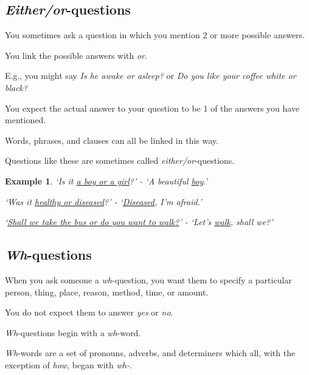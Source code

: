 \documentclass[oneside]{book}
\numberwithin{equation}{section}
\newtheorem{example}{Example}[section]
\begin{document}
\subsection{\textit{Either/or}-questions}
\noindent{} You sometimes ask a question in which you mention 2 or more possible answers.

You link the possible answers with \textit{or}.

E.g., you might say \textit{Is he awake or asleep?} or \textit{Do you like your coffee white or black?}

You expect the actual answer to your question to be 1 of the answers you have mentioned.

%
Words, phrases, and clauses can all be linked in this way.

%
Questions like these are sometimes called \textit{either/or}-questions.
\begin{example}
    `Is it \underline{a boy or a girl}?' - `A beautiful \underline{boy}.'
    
    `Was it \underline{healthy or diseased}?' - `\underline{Diseased}, I'm afraid.'
    
    `\underline{Shall we take the bus or do you want to walk?}' - `Let's \underline{walk}, shall we?'
\end{example}

\subsection{\textit{Wh}-questions}
\noindent{} When you ask someone a \textit{wh}-question, you want them to specify a particular person, thing, place, reason, method, time, or amount.

You do not expect them to answer \textit{yes} or \textit{no}.

%
\noindent{} \textit{Wh}-questions begin with a \textit{wh}-word.

%
\textit{Wh}-words are a set of pronouns, adverbs, and determiners which all, with the exception of \textit{how}, began with \textit{wh-}.
\end{document}
